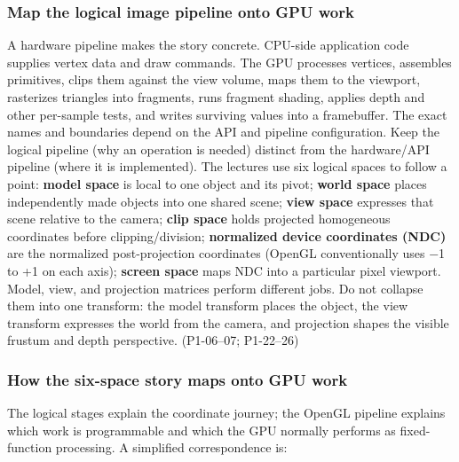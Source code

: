 \subsubsection{Map the logical image pipeline onto GPU work}\label{03-visual-computing-i-ch018-map-the-logical-image-pipeline-onto-gpu-work}

A hardware pipeline makes the story concrete. CPU-side application code supplies vertex data and draw commands. The GPU processes vertices, assembles primitives, clips them against the view volume, maps them to the viewport, rasterizes triangles into fragments, runs fragment shading, applies depth and other per-sample tests, and writes surviving values into a framebuffer. The exact names and boundaries depend on the API and pipeline configuration. Keep the logical pipeline (why an operation is needed) distinct from the hardware/API pipeline (where it is implemented). The lectures use six logical spaces to follow a point: \textbf{model space} is local to one object and its pivot; \textbf{world space} places independently made objects into one shared scene; \textbf{view space} expresses that scene relative to the camera; \textbf{clip space} holds projected homogeneous coordinates before clipping/division; \textbf{normalized device coordinates (NDC)} are the normalized post-projection coordinates (OpenGL conventionally uses −1 to +1 on each axis); \textbf{screen space} maps NDC into a particular pixel viewport. Model, view, and projection matrices perform different jobs. Do not collapse them into one transform: the model transform places the object, the view transform expresses the world from the camera, and projection shapes the visible frustum and depth perspective. (P1-06--07; P1-22--26)

\subsubsection{How the six-space story maps onto GPU work}\label{03-visual-computing-i-ch018-how-the-six-space-story-maps-onto-gpu-work}

The logical stages explain the coordinate journey; the OpenGL pipeline explains which work is programmable and which the GPU normally performs as fixed-function processing. A simplified correspondence is:

